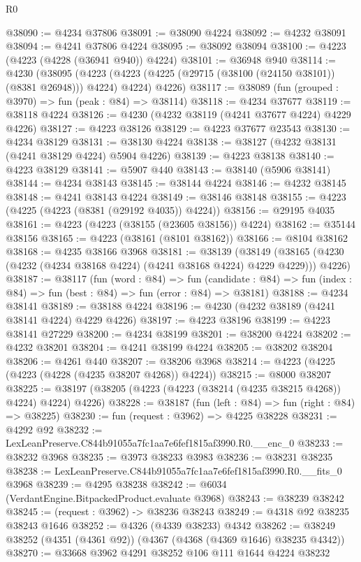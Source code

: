 \begin{lexlean}{R0}
\begin{coremodule}
@38090 := @4234 @37806
@38091 := @38090 @4224
@38092 := @4232 @38091
@38094 := @4241 @37806 @4224
@38095 := @38092 @38094
@38100 := @4223 (@4223 (@4228 (@36941 @940)) @4224)
@38101 := @36948 @940
@38114 := @4230
    (@38095
      (@4223 (@4223 (@4225 (@29715 (@38100 (@24150 @38101)) (@8381 @26948))) @4224) @4224)
      @4226)
@38117 := @38089 (fun (grouped : @3970) => fun (peak : @84) => @38114)
@38118 := @4234 @37677
@38119 := @38118 @4224
@38126 := @4230 (@4232 @38119 (@4241 @37677 @4224) @4229 @4226)
@38127 := @4223 @38126
@38129 := @4223 @37677 @23543
@38130 := @4234 @38129
@38131 := @38130 @4224
@38138 := @38127 (@4232 @38131 (@4241 @38129 @4224) @5904 @4226)
@38139 := @4223 @38138
@38140 := @4223 @38129
@38141 := @5907 @440
@38143 := @38140 (@5906 @38141)
@38144 := @4234 @38143
@38145 := @38144 @4224
@38146 := @4232 @38145
@38148 := @4241 @38143 @4224
@38149 := @38146 @38148
@38155 := @4223 (@4225 (@4223 (@8381 (@29192 @4035)) @4224))
@38156 := @29195 @4035
@38161 := @4223 (@4223 (@38155 (@23605 @38156)) @4224)
@38162 := @35144 @38156
@38165 := @4223 (@38161 (@8101 @38162))
@38166 := @8104 @38162
@38168 := @4235 @38166 @3968
@38181 := @38139
    (@38149 (@38165 (@4230 (@4232 (@4234 @38168 @4224) (@4241 @38168 @4224) @4229 @4229))) @4226)
@38187 := @38117
    (fun (word : @84) =>
    fun (candidate : @84) => fun (index : @84) => fun (best : @84) => fun (error : @84) => @38181)
@38188 := @4234 @38141
@38189 := @38188 @4224
@38196 := @4230 (@4232 @38189 (@4241 @38141 @4224) @4229 @4226)
@38197 := @4223 @38196
@38199 := @4223 @38141 @27229
@38200 := @4234 @38199
@38201 := @38200 @4224
@38202 := @4232 @38201
@38204 := @4241 @38199 @4224
@38205 := @38202 @38204
@38206 := @4261 @440
@38207 := @38206 @3968
@38214 := @4223 (@4225 (@4223 (@4228 (@4235 @38207 @4268)) @4224))
@38215 := @8000 @38207
@38225 := @38197 (@38205 (@4223 (@4223 (@38214 (@4235 @38215 @4268)) @4224) @4224) @4226)
@38228 := @38187 (fun (left : @84) => fun (right : @84) => @38225)
@38230 := fun (request : @3962) => @4225 @38228
@38231 := @4292 @92
@38232 := LexLeanPreserve.C844b91055a7fc1aa7e6fef1815af3990.R0.__enc_0
@38233 := @38232 @3968
@38235 := @3973 @38233 @3983
@38236 := @38231 @38235
@38238 := LexLeanPreserve.C844b91055a7fc1aa7e6fef1815af3990.R0.__fits_0 @3968
@38239 := @4295 @38238
@38242 := @6034 (VerdantEngine.BitpackedProduct.evaluate @3968)
@38243 := @38239 @38242
@38245 := (request : @3962) -> @38236 @38243
@38249 := @4318 @92 @38235 @38243 @1646
@38252 := @4326 (@4339 @38233) @4342
@38262 := @38249 @38252 (@4351 (@4361 @92)) (@4367 (@4368 (@4369 @1646) @38235 @4342))
@38270 := @33668 @3962 @4291 @38252 @106 @111 @1644 @4224 @38232

\end{coremodule}
\end{lexlean}
